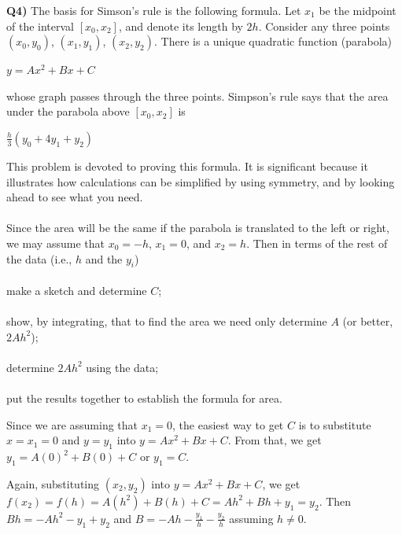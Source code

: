 \documentclass[9pt]{article}
\begin{document}
\begin{tcolorbox}
  \textbf{Q4)} The basis for Simson's rule is the following formula. Let $x_1$ be the midpoint of the interval $[x_0, x_2]$, and denote its length by $2h$. Consider any three points $(x_0, y_0)$, $(x_1, y_1)$, $(x_2, y_2)$. There is a unique quadratic function (parabola) \\
  \begin{center}
    $y = Ax^2 + Bx + C$
  \end{center}
  \begin{center}
  \end{center}
  whose graph passes through the three points. Simpson's rule says that the area under the parabola above $[x_0, x_2]$ is
  \begin{center}
    $\frac{h}{3}(y_0 + 4y_1 + y_2)$
  \end{center}
  \begin{center}
  \end{center}
  This problem is devoted to proving this formula. It is significant because it illustrates how calculations can be simplified by using symmetry, and by looking ahead to see what you need.\\
  \\
  Since the area will be the same if the parabola is translated to the left or right, we may assume that $x_0 = -h$, $x_1 = 0$, and $x_2 = h$. Then in terms of the rest of the data (i.e., $h$ and the $y_i$) \\
  \\
  make a sketch and determine $C$;\\
  \\
  show, by integrating, that to find the area we need only determine $A$ (or better, $2Ah^2$);\\
  \\
  determine $2Ah^2$ using the data;\\
  \\
  put the results together to establish the formula for area.
\end{tcolorbox}

Since we are assuming that $x_1 = 0$, the easiest way to get $C$ is to substitute $x = x_1 = 0$ and $y = y_1$ into $y = Ax^2 + Bx + C$. From that, we get $y_1 = A(0)^2 + B(0) + C$ or $y_1 = C$.

Again, substituting $(x_2, y_2)$ into $y = Ax^2 + Bx + C$, we get $f(x_2) = f(h) = A(h^2) + B(h) + C = Ah^2 + Bh + y_1 = y_2$. Then $Bh = -Ah^2 - y_1 + y_2$ and $B = -Ah - \frac{y_1}{h} - \frac{y_2}{h}$ assuming $h \neq 0$.
\end{document}
